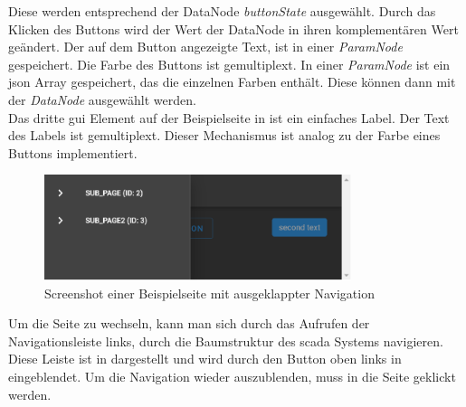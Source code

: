 Diese werden entsprechend der DataNode \emph{buttonState} ausgewählt. 
Durch das Klicken des Buttons wird der Wert der DataNode in ihren komplementären Wert geändert.
Der auf dem Button angezeigte Text, ist in einer \emph{ParamNode} gespeichert. Die Farbe des Buttons ist gemultiplext.
In einer \emph{ParamNode} ist ein \ac{json} Array gespeichert, das die einzelnen Farben enthält.
Diese können dann mit der  \emph{DataNode} ausgewählt werden. 
\\Das dritte \ac{gui} Element auf der Beispielseite in  ist ein einfaches Label.
Der Text des Labels ist gemultiplext. Dieser Mechanismus ist analog zu der Farbe eines Buttons implementiert. 

\begin{figure}[ht]
  \centering
  \includegraphics[width=0.8\textwidth]{content/hauptteil/umsetzungPoC/frontend/res/nav.pdf}
  \caption{Screenshot einer Beispielseite mit ausgeklappter Navigation}
  \label{fig:frontend:poc:page:nav}
\end{figure}
Um die Seite zu wechseln, kann man sich durch das Aufrufen der Navigationsleiste links, durch die Baumstruktur des \ac{scada} Systems navigieren.
Diese Leiste ist in  dargestellt und wird durch den Button oben links in  eingeblendet.
Um die Navigation wieder auszublenden, muss in die Seite geklickt werden.